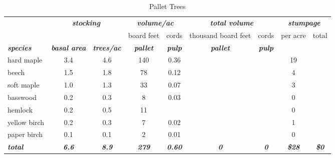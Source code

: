 \documentclass[landscape]{article}
\begin{document}
\begin{table}[H]

\caption{\label{tab:unnamed-chunk-6}Pallet Trees}
\fontsize{10}{12}\selectfont
\begin{tabular}[t]{lcccccccc}
\toprule
\multicolumn{1}{c}{\em{\textbf{ }}} & \multicolumn{2}{c}{\em{\textbf{stocking}}} & \multicolumn{2}{c}{\em{\textbf{volume/ac }}} & \multicolumn{2}{c}{\em{\textbf{total volume}}} & \multicolumn{2}{c}{\em{\textbf{stumpage}}} \\
\cmidrule(l{3pt}r{3pt}){2-3} \cmidrule(l{3pt}r{3pt}){4-5} \cmidrule(l{3pt}r{3pt}){6-7} \cmidrule(l{3pt}r{3pt}){8-9}
\multicolumn{3}{c}{ } & \multicolumn{1}{c}{board feet} & \multicolumn{1}{c}{cords} & \multicolumn{1}{c}{thousand board feet} & \multicolumn{1}{c}{cords} & \multicolumn{1}{c}{per acre} & \multicolumn{1}{c}{total} \\
\cmidrule(l{3pt}r{3pt}){4-4} \cmidrule(l{3pt}r{3pt}){5-5} \cmidrule(l{3pt}r{3pt}){6-6} \cmidrule(l{3pt}r{3pt}){7-7} \cmidrule(l{3pt}r{3pt}){8-8} \cmidrule(l{3pt}r{3pt}){9-9}
\rowcolor[HTML]{DCDCDC}  \em{\textbf{species}} & \em{\textbf{basal area}} & \em{\textbf{trees/ac}} & \em{\textbf{pallet}} & \em{\textbf{pulp}} & \em{\textbf{pallet}} & \em{\textbf{pulp}} & \em{\textbf{ }} & \em{\textbf{ }}\\
\midrule
\rowcolor{gray!6}  hard maple & 3.4 & 4.6 & 140 & 0.36 &  &  & 19 & \\
 
beech & 1.5 & 1.8 & 78 & 0.12 &  &  & 4 & \\
 
\rowcolor{gray!6}  soft maple & 1.0 & 1.3 & 33 & 0.07 &  &  & 3 & \\
 
basswood & 0.2 & 0.3 & 8 & 0.03 &  &  & 0 & \\
 
\rowcolor{gray!6}  hemlock & 0.2 & 0.5 & 11 &  &  &  & 0 & \\
 
yellow birch & 0.2 & 0.3 & 7 & 0.02 &  &  & 1 & \\
 
\rowcolor{gray!6}  paper birch & 0.1 & 0.1 & 2 & 0.01 &  &  & 0 & \\
 
\rowcolor[HTML]{DCDCDC}  \em{\textbf{total}} & \em{\textbf{6.6}} & \em{\textbf{8.9}} & \em{\textbf{279}} & \em{\textbf{0.60}} & \em{\textbf{0}} & \em{\textbf{0}} & \em{\textbf{\$28}} & \em{\textbf{\$0}}\\
\bottomrule
\end{tabular}
\end{table}
\end{document}
